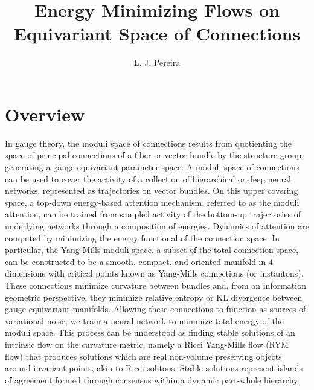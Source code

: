 \documentclass{article}
\title{Energy Minimizing Flows on \\ Equivariant Space of Connections }
\author{%
  L. J. Pereira \\
}
\begin{document}
\setlength{\abovedisplayskip}{4pt}
\setlength{\belowdisplayskip}{4pt}

\vspace{-2cm}
\maketitle


\vspace{-1.3cm}

\renewcommand{\baselinestretch}{1.0}\normalsize
\section*{Overview}
In gauge theory, the moduli space of connections results from quotienting the space of principal connections of a fiber or vector bundle by the structure group, generating a gauge equivariant parameter space. A moduli space of connections can be used to cover the activity of a collection of hierarchical or deep neural networks, represented as trajectories on vector bundles. On this upper covering space, a top-down energy-based attention mechanism, referred to as the moduli attention, can be trained from sampled activity of the bottom-up trajectories of underlying networks through a composition of energies. Dynamics of attention are computed by minimizing the energy functional of the connection space. In particular, the Yang-Mills moduli space, a subset of the total connection space, can be constructed to be a smooth, compact, and oriented manifold in 4 dimensions with critical points known as Yang-Mills connections (or instantons). These connections minimize curvature between bundles and, from an information geometric perspective, they minimize relative entropy or KL divergence between gauge equivariant manifolds. Allowing these connections to function as sources of variational noise, we train a neural network to minimize total energy of the moduli space. This process can be understood as finding stable solutions of an intrinsic flow on the curvature metric, namely a Ricci Yang-Mills flow (RYM flow) that produces solutions which are real non-volume preserving objects around invariant points, akin to Ricci solitons. Stable solutions represent islands of agreement formed through consensus within a dynamic part-whole hierarchy. 

\end{document}
